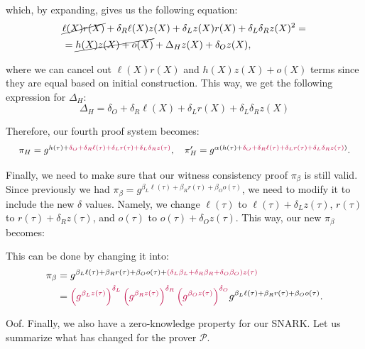 \documentclass[../lecture-notes-148x210.tex]{subfiles}
\begin{document}
which, by expanding, gives us the following equation:
\begin{equation*}
    \begin{aligned}
        &\cancel{\ell(X)r(X)} + \delta_R \ell(X)z(X) + \delta_L z(X)r(X) + \delta_L \delta_R z(X)^2 = \\ 
        &= \cancel{h(X)z(X) + o(X)} + \Delta_Hz(X) + \delta_O z(X), \\
    \end{aligned}
\end{equation*}

where we can cancel out $\ell(X)r(X)$ and $h(X)z(X) + o(X)$ terms since they are equal based on initial construction. This way, we get the following expression for $\Delta_H$:
\begin{equation*}
    \Delta_H = \delta_O + \delta_R \ell(X) + \delta_L r(X) + \delta_L \delta_R z(X)
\end{equation*}

Therefore, our fourth proof system becomes:
\begin{equation*}
    \scalebox{0.95}{$
    \pi_H = g^{h(\tau) + \textcolor{purple}{\delta_O + \delta_R \ell(\tau) + \delta_L r(\tau) + \delta_L \delta_R z(\tau)}}, \quad \pi_H' = g^{\alpha(h(\tau) + \textcolor{purple}{\delta_O + \delta_R \ell(\tau) + \delta_L r(\tau) + \delta_L \delta_R z(\tau)})}.
    $}
\end{equation*}

Finally, we need to make sure that our witness consistency proof $\pi_{\beta}$ is still valid. Since previously we had $\pi_{\beta} = g^{\beta_L\ell(\tau) + \beta_Rr(\tau) + \beta_Oo(\tau)}$, we need to modify it to include the new $\delta$ values. Namely, we change $\ell(\tau)$ to $\ell(\tau)+\delta_Lz(\tau)$, $r(\tau)$ to $r(\tau)+\delta_Rz(\tau)$, and $o(\tau)$ to $o(\tau)+\delta_Oz(\tau)$. This way, our new $\pi_{\beta}$ becomes:

This can be done by changing it into:
\begin{align*}
    \pi_{\beta} &= g^{\beta_L\ell(\tau) + \beta_Rr(\tau) + \beta_Oo(\tau) + \textcolor{purple}{(\delta_L\beta_L + \delta_R\beta_R + \delta_O\beta_O)z(\tau)}} \\&= \textcolor{purple}{\left(g^{\beta_L z(\tau)}\right)^{\delta_L}\left(g^{\beta_R z(\tau)}\right)^{\delta_R}\left(g^{\beta_O z(\tau)}\right)^{\delta_O}}g^{\beta_L\ell(\tau) + \beta_Rr(\tau) + \beta_Oo(\tau)}.
\end{align*}

Oof. Finally, we also have a zero-knowledge property for our SNARK. Let us summarize what has changed for the prover $\mathcal{P}$.
\end{document}
